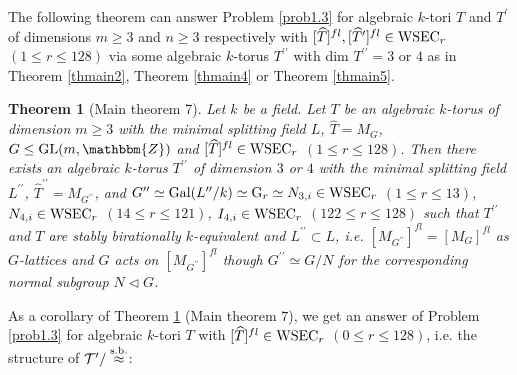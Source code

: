 \documentclass{amsart}
\theoremstyle{plain}
\newtheorem{theorem}{Theorem}[section]
\theoremstyle{definition}
\theoremstyle{remark}
\newcommand{\bZ}{\mathbbm{Z}}\newcommand{\bQ}{\mathbbm{Q}}
\newcommand{\GL}{{\rm GL}}\newcommand{\SL}{{\rm SL}}
\newcounter{sub}\def\tr{\mbox{tr }}
\begin{document}
The following theorem can answer Problem \ref{prob1.3} 
for algebraic $k$-tori $T$ and $T^\prime$ of 
dimensions $m\geq 3$ and $n\geq 3$ respectively 
with $[\widehat{T}]^{fl}, [\widehat{T}^\prime]^{fl}\in {\rm WSEC}_r$ 
$(1\leq r\leq 128)$ via some algebraic $k$-torus 
$T^{\prime\prime}$ with dim $T^{\prime\prime}=3$ or $4$ 
as in 
{Theorem \ref{thmain2}}, {Theorem \ref{thmain4}} 
or {Theorem \ref{thmain5}}.

\begin{theorem}[Main theorem 7]\label{thmain7}
Let $k$ be a field. 
Let $T$ be an algebraic $k$-torus of dimension $m\geq 3$ 
with the minimal splitting field $L$, 
$\widehat{T}=M_G$, $G\leq \GL(m,\bZ)$ and 
$[\widehat{T}]^{fl}\in {\rm WSEC}_r$ $(1\leq r\leq 128)$. 
Then there exists an algebraic $k$-torus $T^{\prime\prime}$ 
of dimension $3$ or $4$ 
with the minimal splitting field $L^{\prime\prime}$, 
$\widehat{T}^{\prime\prime}=M_{G^{\prime\prime}}$, and 
$G^{\prime\prime}\simeq {\rm Gal}(L^{\prime\prime}/k)\simeq {\rm G}_r\simeq N_{3,i}\in {\rm WSEC}_r$ $(1\leq r\leq 13)$, 
$N_{4,i}\in {\rm WSEC}_r$ $(14\leq r\leq 121)$, $I_{4,i}\in {\rm WSEC}_r$ $(122\leq r\leq 128)$ 
%
such that $T^{\prime\prime}$ and $T$ are stably birationally $k$-equivalent 
and $L^{\prime\prime}\subset L$, i.e. 
$[M_{G^{\prime\prime}}]^{fl}=[M_G]^{fl}$ as $G$-lattices and 
$G$ acts on $[M_{G^{\prime\prime}}]^{fl}$ though 
$G^{\prime\prime}\simeq G/N$ for the corresponding 
normal subgroup $N\lhd G$. 
\end{theorem}
%
As a corollary of Theorem \ref{thmain7} (Main theorem $7$), 
we get an answer of Problem \ref{prob1.3} 
for algebraic $k$-tori $T$ 
with $[\widehat{T}]^{fl}\in {\rm WSEC}_r$ $(0\leq r\leq 128)$, 
i.e. the structure of $\mathcal{T}^\prime/\stackrel{\rm s.b.}{\approx}$: 
%
\end{document}
